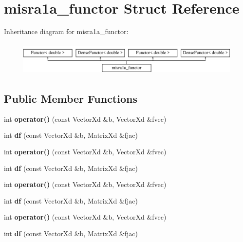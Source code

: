 \hypertarget{structmisra1a__functor}{}\section{misra1a\+\_\+functor Struct Reference}
\label{structmisra1a__functor}
Inheritance diagram for misra1a\+\_\+functor\+:\begin{figure}[H]
\begin{center}
\leavevmode
\includegraphics[height=1.728395cm]{structmisra1a__functor}
\end{center}
\end{figure}
\subsection*{Public Member Functions}
\begin{DoxyCompactItemize}
\item 
\mbox{\label{structmisra1a__functor_af72bea8647a5547dcc98e0445f6eef47}} 
int {\bfseries operator()} (const Vector\+Xd \&b, Vector\+Xd \&fvec)
\item 
\mbox{\label{structmisra1a__functor_a426e241de7896552f6e5c07bd738231c}} 
int {\bfseries df} (const Vector\+Xd \&b, Matrix\+Xd \&fjac)
\item 
\mbox{\label{structmisra1a__functor_af72bea8647a5547dcc98e0445f6eef47}} 
int {\bfseries operator()} (const Vector\+Xd \&b, Vector\+Xd \&fvec)
\item 
\mbox{\label{structmisra1a__functor_a426e241de7896552f6e5c07bd738231c}} 
int {\bfseries df} (const Vector\+Xd \&b, Matrix\+Xd \&fjac)
\item 
\mbox{\label{structmisra1a__functor_af72bea8647a5547dcc98e0445f6eef47}} 
int {\bfseries operator()} (const Vector\+Xd \&b, Vector\+Xd \&fvec)
\item 
\mbox{\label{structmisra1a__functor_a426e241de7896552f6e5c07bd738231c}} 
int {\bfseries df} (const Vector\+Xd \&b, Matrix\+Xd \&fjac)
\item 
\mbox{\label{structmisra1a__functor_af72bea8647a5547dcc98e0445f6eef47}} 
int {\bfseries operator()} (const Vector\+Xd \&b, Vector\+Xd \&fvec)
\item 
\mbox{\label{structmisra1a__functor_a426e241de7896552f6e5c07bd738231c}} 
int {\bfseries df} (const Vector\+Xd \&b, Matrix\+Xd \&fjac)
\end{DoxyCompactItemize}
